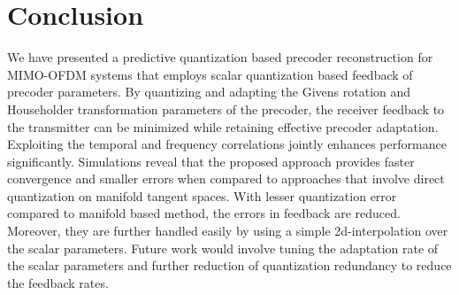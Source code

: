 \documentclass[journal,10pt,twocolumn]{IEEEtran}
\begin{document}



\section{Conclusion}
\label{section4}
We have presented a predictive quantization based precoder
reconstruction for MIMO-OFDM systems that employs scalar quantization
based feedback of precoder parameters. By quantizing and adapting the
Givens rotation and Householder transformation parameters of the
precoder, the receiver feedback to the transmitter can be minimized
while retaining effective precoder adaptation. 
Exploiting the temporal
and frequency correlations jointly enhances performance
significantly. Simulations reveal that the proposed approach provides
faster convergence and smaller errors when compared to
approaches that involve direct quantization on manifold tangent
spaces. With lesser quantization error compared to manifold based method, the 
errors in feedback are reduced. Moreover, they are further 
handled easily by using a simple 2d-interpolation over the scalar parameters.
Future work would involve tuning the adaptation rate of the
scalar parameters and further reduction of quantization redundancy to
reduce the feedback rates.


\vspace{-10pt}
\end{document}

